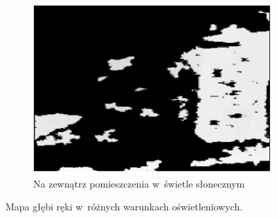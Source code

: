 \begin{savenotes}
\begin{figure}[!htb]
		\begin{subfigure}[b]{0.3\textwidth}
			\centering
			\includegraphics[width=\linewidth]{images/kinecOutdoorFull.png}		
			\caption{Na zewnątrz pomieszczenia w~świetle słonecznym}
			\label{fig:characteristics:kinect:depthMapC}
		\end{subfigure}
																																							
		\caption{Mapa głębi ręki w~różnych warunkach oświetleniowych\cite{Suarez2012}.}
		\label{fig:characteristics:kinect:depthMap}
	\end{figure}
\end{savenotes}
																																	
